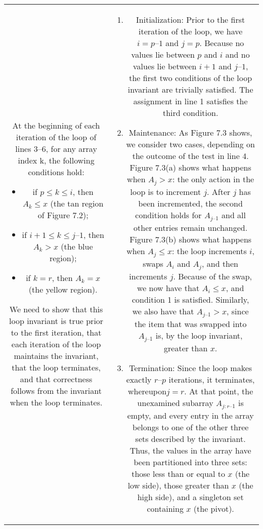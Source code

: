 \begin{tabular}{cc}

At the beginning of each iteration of the loop of lines 3–6, for any array index k, the following conditions hold:
\begin{itemize}
  \item  if $p \le k \le i$, then $A_{k} \le x$ (the tan region of Figure 7.2);
  \item  if $i + 1 \le k \le j – 1$, then$ A_{k} > x$ (the blue region);
  \item  if $k = r$, then $A_{k} = x$ (the yellow region).
\end{itemize}
We need to show that this loop invariant is true prior to the first iteration, that each iteration of the loop maintains the invariant, that the loop terminates, and that correctness follows from the invariant when the loop terminates.

& 

\begin{enumerate}
  \item Initialization: Prior to the first iteration of the loop, we have $i = p – 1$ and $ j= p$. Because no values lie between $p$ and $i$ and no values lie between $i + 1$ and $j – 1$, the first two conditions of the loop invariant are trivially satisfied. The assignment in line 1 satisfies the third condition.
  \item Maintenance: As Figure 7.3 shows, we consider two cases, depending on the outcome of the test in line 4. Figure 7.3(a) shows what happens when $A_{j} > x$: the only action in the loop is to increment $j$. After $j$  has been incremented, the second condition holds for $A_{j – 1}$ and all other entries remain unchanged. Figure 7.3(b) shows what happens when $A_{j} \le x$: the loop increments $i$, swaps $A_{i}$ and $A_{j}$, and then increments $j$. Because of the swap, we now have that $A_{i} \le x$, and condition 1 is satisfied. Similarly, we also have that $A_{j – 1} > x$, since the item that was swapped into $A_{j – 1}$ is, by the loop invariant, greater than $x$.
  \item Termination: Since the loop makes exactly $r – p$ iterations, it terminates, whereupon$ j= r$. At that point, the unexamined subarray $A_{j : r – 1}$ is empty, and every entry in the array belongs to one of the other three sets described by the invariant. Thus, the values in the array have been partitioned into three sets: those less than or equal to $x$ (the low side), those greater than $x$ (the high side), and a singleton set containing $x$ (the pivot).


\end{enumerate}



\end{tabular}

